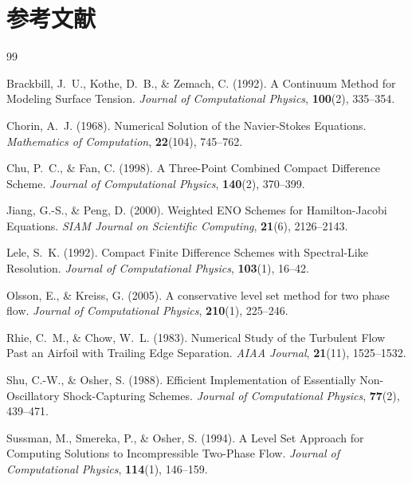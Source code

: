 \documentclass[12pt, a4paper, titlepage, xelatex, ja=standard]{bxjsarticle}
\begin{document}
\section*{参考文献}

\begin{thebibliography}{99}

Brackbill, J.~U., Kothe, D.~B., \& Zemach, C. (1992).
A Continuum Method for Modeling Surface Tension.
\textit{Journal of Computational Physics}, \textbf{100}(2), 335--354.

Chorin, A.~J. (1968).
Numerical Solution of the Navier-Stokes Equations.
\textit{Mathematics of Computation}, \textbf{22}(104), 745--762.

Chu, P.~C., \& Fan, C. (1998).
A Three-Point Combined Compact Difference Scheme.
\textit{Journal of Computational Physics}, \textbf{140}(2), 370--399.

Jiang, G.-S., \& Peng, D. (2000).
Weighted ENO Schemes for Hamilton-Jacobi Equations.
\textit{SIAM Journal on Scientific Computing}, \textbf{21}(6), 2126--2143.

Lele, S.~K. (1992).
Compact Finite Difference Schemes with Spectral-Like Resolution.
\textit{Journal of Computational Physics}, \textbf{103}(1), 16--42.

Olsson, E., \& Kreiss, G. (2005).
A conservative level set method for two phase flow.
\textit{Journal of Computational Physics}, \textbf{210}(1), 225--246.

Rhie, C.~M., \& Chow, W.~L. (1983).
Numerical Study of the Turbulent Flow Past an Airfoil with Trailing Edge Separation.
\textit{AIAA Journal}, \textbf{21}(11), 1525--1532.

Shu, C.-W., \& Osher, S. (1988).
Efficient Implementation of Essentially Non-Oscillatory Shock-Capturing Schemes.
\textit{Journal of Computational Physics}, \textbf{77}(2), 439--471.

Sussman, M., Smereka, P., \& Osher, S. (1994).
A Level Set Approach for Computing Solutions to Incompressible Two-Phase Flow.
\textit{Journal of Computational Physics}, \textbf{114}(1), 146--159.


\end{thebibliography}
\end{document}
